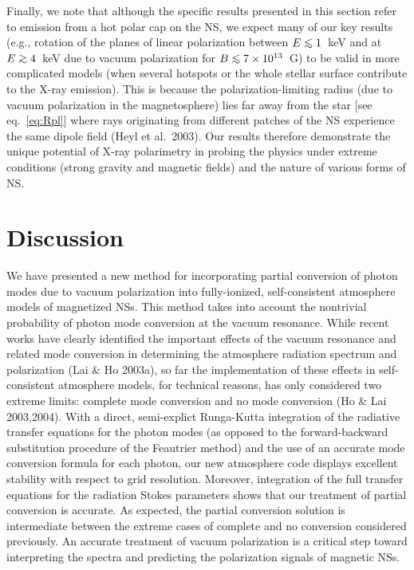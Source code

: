 \documentclass[useAMS,onecolumn,usenatbib,usegraphicx]{mn2e}
\def\go{\mathrel{\raise.3ex\hbox{$>$}\mkern-14mu\lower0.6ex\hbox{$\sim$}}}
\def\lo{\mathrel{\raise.3ex\hbox{$<$}\mkern-14mu\lower0.6ex\hbox{$\sim$}}}
\begin{document}
Finally, we note that although the specific results presented
in this section refer to emission from a hot polar cap on the NS,
we expect many of our key results (e.g., 
rotation of the planes of
linear polarization between $E\lo 1$~keV and at $E\go 4$~keV due to 
vacuum polarization 
for $B\lo 7\times 10^{13}$~G) to be valid in more complicated models
(when several hotspots or the whole stellar surface contribute to the
X-ray emission). This is because the polarization-limiting radius (due to
vacuum polarization in the magnetosphere) lies far away from the star
[see eq.~\ref{eq:Rpl}] where rays originating from different patches of 
the NS experience the same dipole field (Heyl et al.~2003).
Our results therefore demonstrate the unique potential of X-ray
polarimetry in probing the physics under extreme conditions 
(strong gravity and magnetic fields) and the nature of various forms 
of NS.


\section{Discussion}
\label{sect:Discussion}

We have presented a new method for incorporating partial conversion of 
photon modes due to vacuum polarization into fully-ionized, self-consistent 
atmosphere models 
of magnetized NSs.
This method takes into account the 
nontrivial probability of photon 
mode conversion at the vacuum resonance.
While recent works have clearly identified the 
important effects of the vacuum resonance and related mode conversion
in determining the atmosphere radiation spectrum and polarization 
(Lai \& Ho 2003a), so far the implementation of these effects
in self-consistent atmosphere models, for technical reasons, 
has only considered two extreme limits: 
complete mode conversion and no mode conversion (Ho \& Lai 2003,2004).
With a direct, semi-explict Runga-Kutta integration of the radiative 
transfer equations for the photon modes 
(as opposed to the forward-backward substitution 
procedure of the Feautrier method) and the use of an accurate mode
conversion formula for each photon, our new atmosphere code
displays excellent stability with respect to grid resolution. Moreover, 
integration of the full transfer equations for the radiation Stokes 
parameters shows that our treatment of partial conversion is accurate. 
As expected, the partial conversion solution is intermediate between 
the extreme cases of complete and no conversion considered previously.
An accurate treatment of vacuum polarization is a critical step toward 
interpreting the spectra and 
predicting the polarization signals of magnetic NSs.
\end{document}
